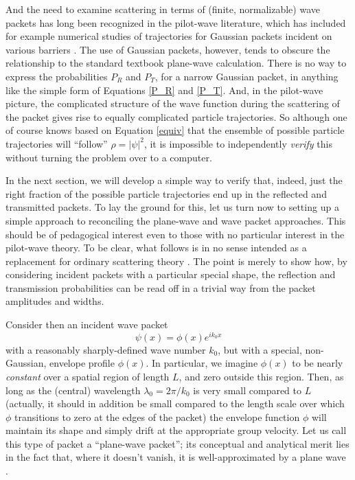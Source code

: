 \documentclass[aps,prc,onecolumn,letterpaper,floatfix,12pt]{revtex4}
\begin{document}
And the need to examine scattering in terms of (finite, normalizable) 
wave packets has long been recognized in the pilot-wave literature,
which has included for example numerical studies of trajectories for
Gaussian packets incident on various barriers  \cite{dh,uu,holland}. 
The use of Gaussian
packets, however, tends to obscure the relationship to the standard
textbook plane-wave calculation.  There is no way to express the
probabilities $P_R$
and $P_T$, for a narrow Gaussian packet, in anything like the
simple form of Equations \eqref{P_R} and \eqref{P_T}.  
And, in the
pilot-wave picture, the complicated structure of the wave function
during the scattering of the packet gives rise to equally complicated 
particle trajectories.  So although one of course knows based on
Equation \eqref{equiv} that the ensemble of possible particle trajectories will
``follow'' $\rho = |\psi|^2$, it is impossible to independently
\emph{verify} this without turning the problem over to a computer.

In the next section, we will develop a simple way to verify that,
indeed, just the right fraction of the possible particle trajectories
end up in the reflected and transmitted packets.  To lay the ground
for this, let us turn now to setting up a simple approach
to reconciling the plane-wave and wave packet approaches.
This should
be of pedagogical interest even to those with no particular interest
in the pilot-wave theory.  To be clear, what follows is in no sense
intended as a replacement for ordinary scattering
theory \cite{scattering}.  The point
is merely to show how, by considering incident packets with a
particular special shape, the reflection and transmission
probabilities can be read off in a trivial way from the packet
amplitudes and widths. 

Consider then an incident wave packet
\begin{equation}
\psi(x) = \phi(x) e^{i k_0 x}
\end{equation}
with a reasonably sharply-defined wave number $k_0$, but with a
special, non-Gaussian, envelope profile $\phi(x)$.  In particular, we
imagine $\phi(x)$ to be nearly \emph{constant} over a spatial region
of length $L$, and zero outside this region.  Then, as long as the
(central) wavelength $\lambda_0 = 2 \pi / k_0$ is very small compared to
$L$ (actually, it should in addition be small compared to the length
scale over which $\phi$ transitions to zero at the edges of the
packet) the envelope function $\phi$ will maintain its shape and
simply drift at the appropriate group velocity.  Let us call this type
of packet a ``plane-wave packet''; its conceptual and analytical merit
lies in the fact that, where it doesn't vanish, it is
well-approximated by a plane wave \cite{planewave}. 
\end{document}
